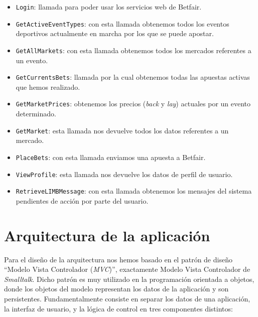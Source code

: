 \begin{itemize}
	\item \lstinline{Login}: 
		llamada para poder usar los servicios web de Betfair. 
	\item \lstinline{GetActiveEventTypes}: 
		con esta llamada obtenemos todos los eventos deportivos actualmente en marcha por los que se puede apostar.
	\item  \lstinline{GetAllMarkets}:
		con esta llamada obtenemos todos los mercados referentes a un evento.
	\item  \lstinline{GetCurrentsBets}:
		llamada por la cual obtenemos todas las apuestas activas que hemos realizado.
	\item  \lstinline{GetMarketPrices}:
		obtenemos los precios (\emph{back} y \emph{lay}) actuales por un evento determinado.
	\item  \lstinline{GetMarket}:
		esta llamada nos devuelve todos los datos referentes a un mercado.
	\item  \lstinline{PlaceBets}:
		con esta llamada enviamos una apuesta a Betfair.
	\item  \lstinline{ViewProfile}: 
		esta llamada nos devuelve los datos de perfil de usuario.
	\item  \lstinline{RetrieveLIMBMessage}:
		 con esta llamada obtenemos los mensajes del sistema pendientes de acción por parte del usuario.
\end{itemize}

\section{Arquitectura de la aplicación}


 Para el diseño de la arquitectura nos hemos basado en el patrón de diseño ``Modelo Vista Controlador (\emph{MVC})'', exactamente Modelo Vista Controlador de \emph{Smalltalk}. Dicho patrón es muy utilizado en la programación orientada a objetos, donde los objetos del modelo representan los datos de la aplicación y son persistentes. Fundamentalmente consiste en separar los datos de una aplicación, la interfaz de usuario, y la lógica de control en tres componentes distintos:

